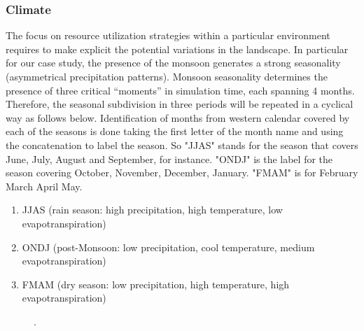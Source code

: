 \documentclass[11pt,oneside,a4paper,openright]{report}
\begin{document}
\subsubsection{Climate}

The focus on resource utilization strategies within a particular environment requires to make explicit
the potential variations in the landscape. In particular for our case study, the presence of the monsoon
generates a strong seasonality (asymmetrical precipitation patterns).
Monsoon seasonality determines the presence of three critical “moments” in simulation time, each
spanning 4 months. Therefore, the seasonal subdivision in three periods will be repeated in a cyclical
way as follows below. Identification of months from western calendar covered by each of the seasons is done 
taking the first letter of the month name and using the concatenation to label the season. So "JJAS" stands 
for the season that covers June, July, August and September, for instance. "ONDJ" is the label for the 
season covering October, November, December, January. "FMAM" is for February March April May.    


\begin{enumerate}
\item JJAS (rain season: high precipitation, high temperature, low evapotranspiration)
\item ONDJ (post-Monsoon: low precipitation, cool temperature, medium evapotranspiration)
\item FMAM (dry season: low precipitation, high temperature, high evapotranspiration)
\end{enumerate}


\begin{figure}[h!]
\centering
\setlength\fboxsep{0pt}
\setlength\fboxrule{0.5pt}
\caption{ .}
\label{fig:jamt_2}
\end{figure}
\end{document}
